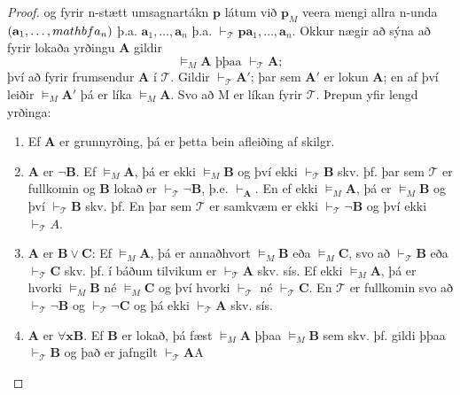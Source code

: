 \documentclass[12pt]{article}
\begin{document}
\begin{setn}
\begin{proof}
    og fyrir n-stætt umsagnartákn $\mathbf{p}$ látum við $\mathbf{p}_M$ veera mengi allra
    n-unda $(\mathbf{a}_1, \dotsc, \\mathbf{a}_n)$ þ.a. 
    \(\mathbf{a}_1, \dotsc, \mathbf{a}_n \)
    þ.a. $\vdash_{\mathcal{T}} \mathbf{p} \mathbf{a}_1, \dotsc, \mathbf{a}_n$.
    Okkur nægir að sýna að fyrir lokaða yrðingu $\mathbf{A}$ gildir
    \[ \models_M \mathbf{A} \text{ þþaa } \vdash_{\mathcal{T}} \mathbf{A}; \]
    því að fyrir frumsendur $\mathbf{A}$ í $\mathcal{T}$. 
    Gildir $\vdash_{\mathcal{T}} \mathbf{A}'$; þar sem $\mathbf{A}'$ er lokun
    $\mathbf{A}$; en af því leiðir $\models_M \mathbf{A}'$ þá er líka $\models_M \mathbf{A}$.
    Svo að M er líkan fyrir $\mathcal{T}$. Þrepun yfir lengd yrðinga:
    \begin{enumerate}[(1)]
    \item Ef $\mathbf{A}$ er grunnyrðing, þá er þetta bein afleiðing af skilgr.
    \item $\mathbf{A}$ er $\lnot \mathbf{B}$. Ef $\models_M \mathbf{A}$, þá er ekki
      $\models_M \mathbf{B}$ og því ekki $\vdash_{\mathcal{T}} \mathbf{B}$ skv. þf.
      þar sem $\mathcal{T}$ er fullkomin og $\mathbf{B}$ lokað er
      $\vdash_{\mathcal{T}} \lnot \mathbf{B}$, þ.e. $\vdash_{\mathbf{A}}$. En ef
      ekki $\models_{M} \mathbf{A}$, þá er $\models_M \mathbf{B}$ og því
      $\vdash_{\mathcal{T}} \mathbf{B}$ skv. þf. En þar sem $\mathcal{T}$ er 
      samkvæm er ekki $\vdash_{\mathcal{T}} \lnot \mathbf{B}$ og því ekki
      $\vdash_{\mathcal{T}} A$.
    \item $\mathbf{A}$ er $\mathbf{B} \vee \mathbf{C}$: Ef $\models_M \mathbf{A}$,
      þá er annaðhvort $\models_M \mathbf{B}$ eða $\models_M \mathbf{C}$,
      svo að $\vdash_{\mathcal{T}} \mathbf{B}$ eða $\vdash_{\mathcal{T}} \mathbf{C}$ skv. þf.
      í báðum tilvikum er $\vdash_{\mathcal{T}} \mathbf{A}$ skv. sís.
      Ef ekki $\models_M \mathbf{A}$, þá er hvorki $\models_M \mathbf{B}$
      né $\models_M \mathbf{C}$ og því hvorki $\vdash_{\mathcal{T}}$ né 
      $\vdash_{\mathcal{T}} \mathbf{C}$.
      En $\mathcal{T}$ er fullkomin svo að $\vdash_{\mathcal{T}} \lnot \mathbf{B}$ 
      og $\vdash_{\mathcal{T}} \lnot \mathbf{C}$ og þá ekki $\vdash_{\mathcal{T}} \mathbf{A}$ skv. sís.

    \item $\mathbf{A}$ er $\forall \mathbf{x} \mathbf{B}$. Ef
      $\mathbf{B}$ er lokað, þá fæst $\models_M \mathbf{A}$ þþaa $\models_M \mathbf{B}$ sem skv.
      þf. gildi þþaa $\vdash_{\mathcal{T}} \mathbf{B}$ og það er jafngilt $\vdash_{\mathcal{T}} \mathbf{A}$A


\end{enumerate}
\end{proof}
\end{setn}
\end{document}
